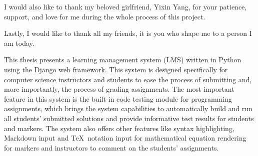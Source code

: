 \medskip

I would also like to thank my beloved girlfriend, Yixin Yang, for your patience,
support, and love for me during the whole process of this project. 

\medskip

Lastly, I would like to thank all my friends, it is you who shape me to a person
I am today.



\tocAndSuch



This thesis presents a learning management system (LMS) written in Python using
the Django web framework. This system is designed specifically for computer
science instructors and students to ease the process of submitting and,
more importantly, the process of grading assignments. 
The most important feature in this system is the built-in code
testing module for programming assignments, which brings the system capabilities
to automatically build and run all students'
submitted solutions and provide informative test results for students and
markers.
The system also offers other features like syntax highlighting, Markdown input
and \TeX\ notation input for mathematical equation rendering for
markers and instructors to comment on the students' assignments.



\afterpreface
